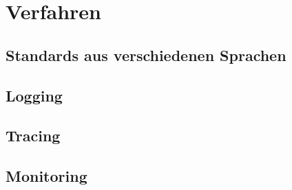 \chapter{Verfahren}\label{ch:verfahren}


\section{Standards aus verschiedenen Sprachen}\label{sec:standards-aus-verschiedenen-sprachen}



\section{Logging}\label{sec:logging-verfahren}



\section{Tracing}\label{sec:tracing-verfahren}



\section{Monitoring}\label{sec:monitoring-verfahren}

